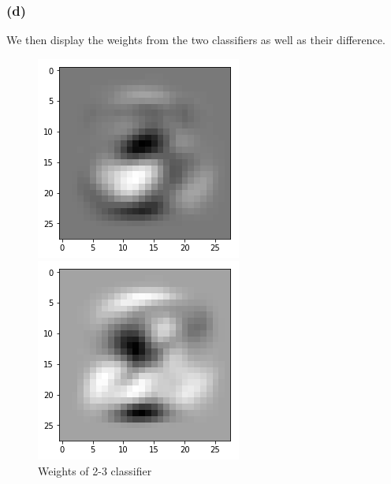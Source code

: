\documentclass{article}
\begin{document}
\subsubsection*{(d)}
We then display the weights from the two classifiers as well as their difference. 
\begin{figure}[h]
	\begin{minipage}{0.3\textwidth}
		\centering
		\includegraphics[width=\textwidth]{pics/2_3.png}
		\caption{Weights of 2-3 classifier}
	\end{minipage}\hfill
	\begin{minipage}{0.3\textwidth}
		\centering
		\includegraphics[width=\textwidth]{pics/2_8.png}

\end{minipage}
\end{figure}
\end{document}
